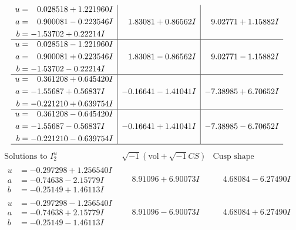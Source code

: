 \documentclass[1p]{elsarticle_modified}
\theoremstyle{definition}
\newcommand{\I}{\sqrt{-1}}
\begin{document}
$$\begin{array}{c|c|c}
\begin{aligned}
u &= \phantom{-}0.028518 + 1.221960 I \\
a &= \phantom{-}0.900081 - 0.223546 I \\
b &= -1.53702 + 0.22214 I\end{aligned}
 & \phantom{-}1.83081 + 0.86562 I & \phantom{-}9.02771 + 1.15882 I \\ \hline\begin{aligned}
u &= \phantom{-}0.028518 - 1.221960 I \\
a &= \phantom{-}0.900081 + 0.223546 I \\
b &= -1.53702 - 0.22214 I\end{aligned}
 & \phantom{-}1.83081 - 0.86562 I & \phantom{-}9.02771 - 1.15882 I \\ \hline\begin{aligned}
u &= \phantom{-}0.361208 + 0.645420 I \\
a &= -1.55687 + 0.56837 I \\
b &= -0.221210 + 0.639754 I\end{aligned}
 & -0.16641 - 1.41041 I & -7.38985 + 6.70652 I \\ \hline\begin{aligned}
u &= \phantom{-}0.361208 - 0.645420 I \\
a &= -1.55687 - 0.56837 I \\
b &= -0.221210 - 0.639754 I\end{aligned}
 & -0.16641 + 1.41041 I & -7.38985 - 6.70652 I\\
 \hline 
 \end{array}$$\newpage$$\begin{array}{c|c|c}  
\text{Solutions to }I^u_{2}& \I (\text{vol} + \sqrt{-1}CS) & \text{Cusp shape}\\
 \hline 
\begin{aligned}
u &= -0.297298 + 1.256540 I \\
a &= -0.74638 - 2.15779 I \\
b &= -0.25149 + 1.46113 I\end{aligned}
 & \phantom{-}8.91096 + 6.90073 I & \phantom{-}4.68084 - 6.27490 I \\ \hline\begin{aligned}
u &= -0.297298 - 1.256540 I \\
a &= -0.74638 + 2.15779 I \\
b &= -0.25149 - 1.46113 I\end{aligned}
 & \phantom{-}8.91096 - 6.90073 I & \phantom{-}4.68084 + 6.27490 I \\ \hline\begin{aligned}

\end{aligned}
\end{array}$$
\end{document}
